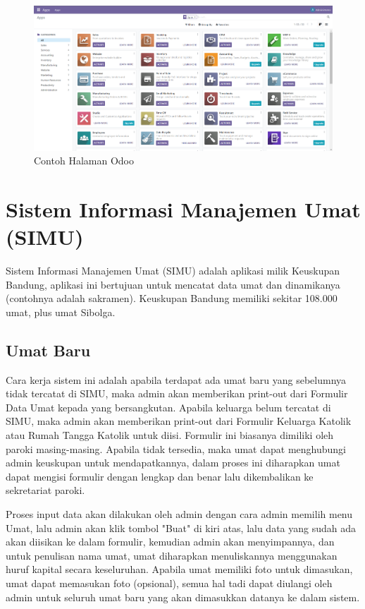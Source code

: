 \begin{figure}[H]
	\centering
	\includegraphics[scale=0.4]{Gambar/halamanOdoo.png}
	\caption{Contoh Halaman Odoo} 
	\label{fig:halamanOdoo}
\end{figure}

\section{Sistem Informasi Manajemen Umat (SIMU)}
\label{sec:simu}
Sistem Informasi Manajemen Umat (SIMU) adalah aplikasi milik Keuskupan Bandung, aplikasi ini bertujuan untuk mencatat data umat dan dinamikanya (contohnya adalah sakramen). Keuskupan Bandung memiliki sekitar 108.000 umat, plus umat Sibolga.
 
\subsection{Umat Baru}
\label{sec:umatBaru}
Cara kerja sistem ini adalah apabila terdapat ada umat baru yang sebelumnya tidak tercatat di SIMU, maka admin akan memberikan print-out dari Formulir Data Umat kepada yang bersangkutan. Apabila keluarga belum tercatat di SIMU, maka admin akan memberikan print-out dari Formulir Keluarga Katolik atau Rumah Tangga Katolik untuk diisi. Formulir ini biasanya dimiliki oleh paroki masing-masing. Apabila tidak tersedia, maka umat dapat menghubungi admin keuskupan untuk mendapatkannya, dalam proses ini diharapkan umat dapat mengisi formulir dengan lengkap dan benar lalu dikembalikan ke sekretariat paroki. 

Proses input data akan dilakukan oleh admin dengan cara admin memilih menu Umat, lalu admin akan klik tombol "Buat" di kiri atas, lalu data yang sudah ada akan diisikan ke dalam formulir, kemudian admin akan menyimpannya, dan untuk penulisan nama umat, umat diharapkan menuliskannya menggunakan huruf kapital secara keseluruhan. Apabila umat memiliki foto untuk dimasukan, umat dapat memasukan foto (opsional), semua hal tadi dapat diulangi oleh admin untuk seluruh umat baru yang akan dimasukkan datanya ke dalam sistem.

